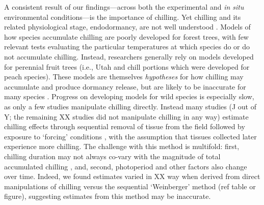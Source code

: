 \documentclass{article}
\begin{document}
\par A consistent result of our findings---across both the experimental and \emph{in situ} environmental conditions---is the importance of chilling. Yet chilling and its related physiological stage, endodormancy, are not well understood \citep{chuine2016}. Models of how species accumulate chilling are poorly developed for forest trees, with few relevant tests evaluating the particular temperatures at which species do or do not accumulate chilling. Instead, researchers generally rely on models developed for perennial fruit trees (i.e., Utah \citep{richardson1974} and chill portions \citep{fishman1987} which were developed for peach species). These models are themselves \emph{hypotheses} for how chilling may accumulate and produce dormancy release, but are likely to be inaccurate for many species \citep{dennis2003}. Progress on developing models for wild species is especially slow, as only a few studies manipulate chilling directly. Instead many studies (J out of Y; the remaining XX studies did not manipulate chilling in any way) estimate chilling effects through sequential removal of tissue from the field followed by exposure to `forcing' conditions \citep{weinberger1950}, with the assumption that tissues collected later experience more chilling. The challenge with this method is multifold: first, chilling duration may not always co-vary with the magnitude of total accumulated chilling \citep{dennis2003}, and, second, photoperiod and other factors also change over time. Indeed, we found estimates varied in XX way when derived from direct manipulations of chilling versus the sequential `Weinberger' method \citep{weinberger1950,polgar2013} (ref table or figure), suggesting estimates from this method may be inaccurate.%
\end{document}

